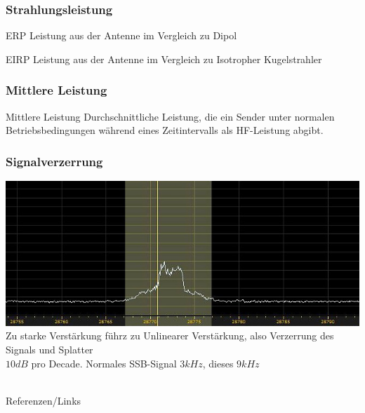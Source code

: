 \begin{frame}
    \frametitle{Strahlungsleistung}
        \begin{block}{ERP} \Large
			Leistung aus der Antenne im Vergleich zu Dipol
	    \end{block}
        \begin{block}{EIRP} \Large
			Leistung aus der Antenne im Vergleich zu Isotropher Kugelstrahler
	    \end{block}
\end{frame}

\begin{frame}
    \frametitle{Mittlere Leistung}
        \begin{block}{Mittlere Leistung} \Large
			Durchschnittliche Leistung, die ein Sender unter normalen Betriebsbedingungen während eines Zeitintervalls als HF-Leistung abgibt.
	    \end{block}
\end{frame}

\begin{frame}
    \frametitle{Signalverzerrung}
        \begin{center}
        \includegraphics[width=1\textwidth]{a07/splatter.jpg}\\[1em]
     	\large Zu starke Verstärkung führz zu Unlinearer Verstärkung, also Verzerrung des Signals und Splatter\\
     	$10dB$ pro Decade. Normales SSB-Signal $3kHz$, dieses $9kHz$
     \end{center}
\end{frame}

\renewcommand{\refname}{Referenzen}

\hypertarget{refs}{}
\textcolor{white}{} \\ %
\Large Referenzen/Links
\footnotesize

